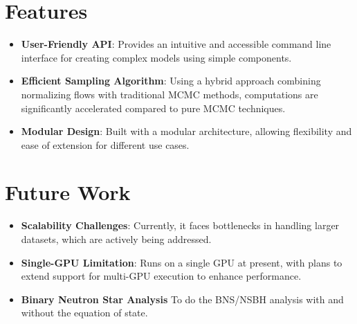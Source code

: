 \documentclass[a0,portrait]{a0poster}
\begin{document}
\begin{multicols}{2}

\section*{Features}

\begin{itemize}

\item \textbf{User-Friendly API}: Provides an intuitive and accessible command line interface for creating complex models using simple components.
\item \textbf{Efficient Sampling Algorithm}: Using a hybrid approach combining normalizing flows with traditional MCMC methods, computations are significantly accelerated compared to pure MCMC techniques.
\item \textbf{Modular Design}: Built with a modular architecture, allowing flexibility and ease of extension for different use cases.

\end{itemize}

\columnbreak

\section*{Future Work}

\begin{itemize}

\item \textbf{Scalability Challenges}: Currently, it faces bottlenecks in handling larger datasets, which are actively being addressed.
\item \textbf{Single-GPU Limitation}: Runs on a single GPU at present, with plans to extend support for multi-GPU execution to enhance performance.
\item \textbf{Binary Neutron Star Analysis} To do the BNS/NSBH analysis with and without the equation of state.

\end{itemize}


\end{multicols}
\end{document}
